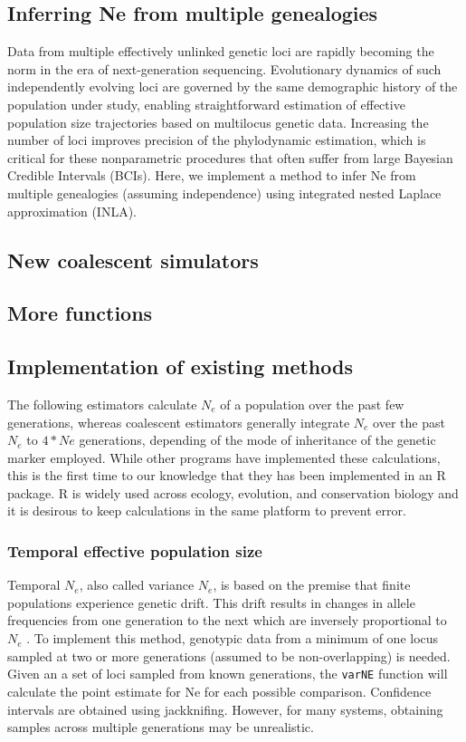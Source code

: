 \documentclass[english,titlepage]{article}
\begin{document}
\subsection*{Inferring Ne from multiple genealogies} 
Data from multiple effectively unlinked genetic loci are rapidly becoming the norm in the era of next-generation sequencing. Evolutionary dynamics of such independently evolving loci are governed by the same demographic history of the population under study, enabling straightforward estimation of effective
population size trajectories based on multilocus genetic data. Increasing the number of loci improves precision of the phylodynamic estimation, which is critical for these nonparametric procedures that often suffer from large Bayesian Credible Intervals (BCIs). Here, we implement a method to infer Ne from multiple genealogies (assuming independence) using integrated nested Laplace approximation (INLA).
\subsection*{New coalescent simulators}
\citep{Palacios2013}

\subsection*{More functions}
\citep{Hein2005}


\subsection*{Implementation of existing methods}

The following estimators calculate $N_e$ of a population over the past few generations, whereas coalescent estimators generally integrate $N_e$ over the past $N_e$ to $4*Ne$ generations, depending of the mode of inheritance of the genetic marker employed. While other programs have implemented these calculations, this is the first time to our knowledge that they has been implemented in an R package. R is widely used across ecology, evolution, and conservation biology and it is desirous to keep calculations in the same platform to prevent error.

\subsubsection*{Temporal effective population size}

Temporal $N_e$, also called variance $N_e$, is based on the premise that finite populations experience genetic drift. This drift results in changes in allele frequencies from one generation to the next which are inversely proportional to $N_e$ \citep{Nei1981}. To implement this method, genotypic data from a minimum of one locus sampled at two or more generations (assumed to be non-overlapping) is needed.  Given an a set of loci sampled from known generations, the \texttt{varNE} function will calculate the point estimate for Ne for each possible comparison. Confidence intervals are obtained using jackknifing. However, for many systems, obtaining samples across multiple generations may be unrealistic.
\end{document}

